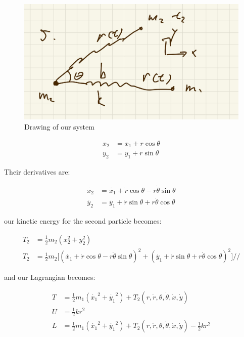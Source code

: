 \documentclass{article}
\numberwithin{equation}{section}
\begin{document}
\begin{figure}[!htb]
\centering
   \begin{minipage}{0.48\textwidth}
     \includegraphics[width=.7\linewidth]{hw/hw1/5.1.jpg}
     \caption{Drawing of our system}
   \end{minipage}\hfill
\end{figure}

\begin{equation}
\begin{split}
        x_2 &= x_1 + r \cos \theta \\
        y_2 &= y_1 + r \sin \theta
\end{split}
\end{equation}

Their derivatives are:

\begin{equation}
    \begin{split}
        \dot{x_2} &= \dot{x_1} + \dot{r} \cos \theta - r \dot\theta \sin \theta  \\
        \dot{y_2} &= \dot{y_1} + \dot{r} \sin \theta + r \dot\theta \cos \theta 
    \end{split}
\end{equation}

our kinetic energy for the second particle becomes:

\begin{equation}
\begin{split}
        T_2 &= \frac{1}{2}m_2 (x^2_2 + y^2_2) \\
        T_2 &= \frac{1}{2} m_2 \lbrack (\dot{x_1} + \dot{r} \cos \theta - r \dot\theta \sin \theta)^2 + (\dot{y_1} + \dot{r} \sin \theta + r \dot\theta \cos \theta )^2 \rbrack //
\end{split}
\end{equation}

and our Lagrangian becomes:

\begin{equation}
\begin{split}
        T &= \frac{1}{2} m_1(\dot{x_1}^2 + \dot{y_1}^2) +   T_2(r, \dot{r}, \theta, \dot\theta, \dot{x}, \dot{y})\\
        U &= \frac{1}{2} kr^2 \\
        L &= \frac{1}{2} m_1(\dot{x_1}^2 + \dot{y_1}^2) +   T_2(r, \dot{r}, \theta, \dot\theta, \dot{x}, \dot{y}) - \frac{1}{2} kr^2
\end{split}
\end{equation}
\end{document}
